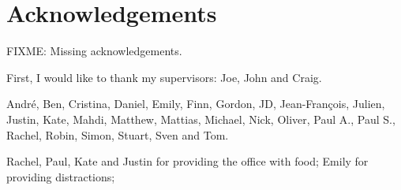 \chapter*{Acknowledgements}
\graphicspath{{Figures/Common/}}









FIXME: Missing acknowledgements.

First, I would like to thank my supervisors: Joe, John and Craig.

André, Ben, Cristina, Daniel, Emily, Finn, Gordon, JD, Jean-François, Julien, Justin, Kate, Mahdi, Matthew, Mattias, Michael, Nick, Oliver, Paul A., Paul S., Rachel, Robin, Simon, Stuart, Sven and Tom.

Rachel, Paul, Kate and Justin for providing the office with food; Emily for providing distractions; 